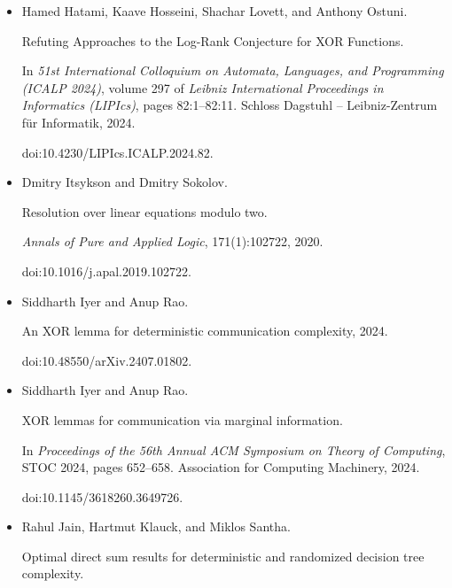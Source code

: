 \documentclass[10pt,a4paper]{article}
\begin{document}
\begin{itemize}
\item[] 
[32]

Hamed Hatami, Kaave Hosseini, Shachar Lovett, and Anthony Ostuni.


Refuting Approaches to the Log-Rank Conjecture for XOR Functions.


In \emph{51st International Colloquium on Automata, Languages, and
Programming (ICALP 2024)}, volume 297 of \emph{Leibniz International
Proceedings in Informatics (LIPIcs)}, pages 82:1–82:11. Schloss Dagstuhl –
Leibniz-Zentrum für Informatik, 2024.


doi:10.4230/LIPIcs.ICALP.2024.82.





\item[] 
[33]

Dmitry Itsykson and Dmitry Sokolov.


Resolution over linear equations modulo two.


\emph{Annals of Pure and Applied Logic}, 171(1):102722, 2020.


doi:10.1016/j.apal.2019.102722.





\item[] 
[34]

Siddharth Iyer and Anup Rao.


An XOR lemma for deterministic communication complexity, 2024.


doi:10.48550/arXiv.2407.01802.





\item[] 
[35]

Siddharth Iyer and Anup Rao.


XOR lemmas for communication via marginal information.


In \emph{Proceedings of the 56th Annual ACM Symposium on Theory of
Computing}, STOC 2024, pages 652–658. Association for Computing Machinery,
2024.


doi:10.1145/3618260.3649726.





\item[] 
[36]

Rahul Jain, Hartmut Klauck, and Miklos Santha.


Optimal direct sum results for deterministic and randomized decision
tree complexity.



\end{itemize}
\end{document}
